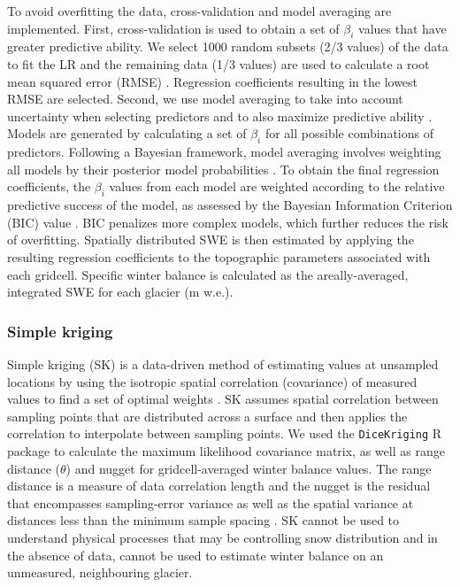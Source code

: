 \documentclass[twocolumn, letterpaper]{igs}
\begin{document}
To avoid overfitting the data, cross-validation and model averaging are implemented. First, cross-validation is used to obtain a set of $\beta_i$ values that have greater predictive ability. We select 1000 random subsets (2/3 values) of the data to fit the LR and the remaining data (1/3 values) are used to calculate a root mean squared error (RMSE) \citep{Kohavi1995}. Regression coefficients resulting in the lowest RMSE are selected. Second, we use model averaging to take into account uncertainty when selecting predictors and to also maximize predictive ability \citep{Madigan1994}. Models are generated by calculating a set of $\beta_i$ for all possible combinations of predictors. Following a Bayesian framework, model averaging involves weighting all models by their posterior model probabilities \citep{Raftery1997}. To obtain the final regression coefficients, the $\beta_i$ values from each model are weighted according to the relative predictive success of the model, as assessed by the Bayesian Information Criterion (BIC) value \citep{Burnham2004}. BIC penalizes more complex models, which further reduces the risk of overfitting. Spatially distributed SWE is then estimated by applying the resulting regression coefficients to the topographic parameters associated with each gridcell. Specific winter balance is calculated as the areally-averaged, integrated SWE for each glacier (m w.e.). 

\subsubsection{Simple kriging}

Simple kriging (SK) is a data-driven method of estimating values at unsampled locations by using the isotropic spatial correlation (covariance) of measured values to find a set of optimal weights \citep{Davis1986, Li2008}. SK assumes spatial correlation between sampling points that are distributed across a surface and then applies the correlation to interpolate between sampling points. We used the \texttt{DiceKriging} R package \citep{Roustant2012} to calculate the maximum likelihood covariance matrix, as well as range distance ($\theta$) and nugget for gridcell-averaged winter balance values. The range distance is a measure of data correlation length and the nugget is the residual that encompasses sampling-error variance as well as the spatial variance at distances less than the minimum sample spacing \citep{Li2008}. SK cannot be used to understand physical processes that may be controlling snow distribution and in the absence of data, cannot be used to estimate winter balance on an unmeasured, neighbouring glacier. 
\end{document}
